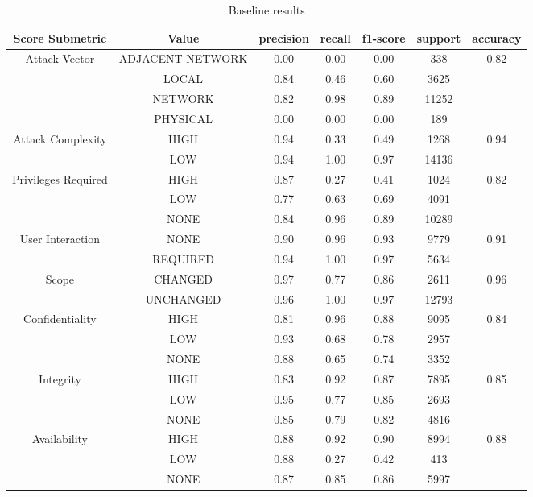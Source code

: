\documentclass[times, utf8, zavrsni, english]{fer}
\begin{document}
\begin{table}[h!]
	\centering
	\begin{tabular}{| c | c | c | c | c | c | c |} 
		\hline
		Score Submetric & Value & precision & recall & f1-score & support & accuracy \\ [0.5ex] 
		\hline\hline
		\multirow{4}{*}{Attack Vector} & ADJACENT NETWORK & 0.00 & 0.00 & 0.00 & 338 & \multirow{4}{*}{0.82} \\ 
										& LOCAL & 0.84 & 0.46 & 0.60 & 3625 & \\ 
										& NETWORK & 0.82 & 0.98 & 0.89 & 11252 & \\ 
										& PHYSICAL & 0.00 & 0.00 & 0.00 & 189 & \\ 
		\hline
		\multirow{2}{*}{Attack Complexity} & HIGH & 0.94 & 0.33 & 0.49 & 1268 & \multirow{2}{*}{0.94} \\ 
											& LOW & 0.94 & 1.00 & 0.97 & 14136 & \\ 
		\hline
		\multirow{3}{*}{Privileges Required} & HIGH & 0.87 & 0.27 & 0.41 & 1024 & \multirow{3}{*}{0.82} \\ 
											& LOW & 0.77 & 0.63 & 0.69 & 4091 & \\ 
											& NONE & 0.84 & 0.96 & 0.89 & 10289 & \\ 
		\hline
		\multirow{2}{*}{User Interaction} & NONE & 0.90 & 0.96 & 0.93 & 9779 & \multirow{2}{*}{0.91} \\ 
										& REQUIRED & 0.94 & 1.00 & 0.97 & 5634 & \\ 
		\hline
		\multirow{2}{*}{Scope} & CHANGED & 0.97 & 0.77 & 0.86 & 2611 & \multirow{2}{*}{0.96} \\ 
											& UNCHANGED & 0.96 & 1.00 & 0.97 & 12793 & \\ 
		\hline
		\multirow{3}{*}{Confidentiality} & HIGH & 0.81 & 0.96 & 0.88 & 9095 & \multirow{3}{*}{0.84} \\ 
											& LOW & 0.93 & 0.68 & 0.78 & 2957 & \\ 
											& NONE & 0.88 & 0.65 & 0.74 & 3352 & \\ 
		\hline
		\multirow{3}{*}{Integrity} & HIGH & 0.83 & 0.92 & 0.87 & 7895 & \multirow{3}{*}{0.85} \\ 
									& LOW & 0.95 & 0.77 & 0.85 & 2693 & \\ 
									& NONE & 0.85 & 0.79 & 0.82 & 4816 & \\ 
		\hline
		\multirow{3}{*}{Availability} & HIGH & 0.88 & 0.92 & 0.90 & 8994 & \multirow{3}{*}{0.88} \\ 
		& LOW & 0.88 & 0.27 & 0.42 & 413 & \\ 
		& NONE & 0.87 & 0.85 & 0.86 & 5997 & \\ 
		\hline
		
	\end{tabular}
	\caption{Baseline results}
	\label{table:11}
\end{table}
\end{document}

